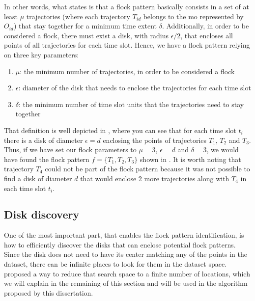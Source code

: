 In other words, what  states is that a flock pattern basically consists in a set of at least $\mu$
trajectories (where each trajectory $T_{id}$ belongs to the \ac{mo} represented by $O_{id}$) that stay together for a
minimum time extent $\delta$. Additionally, in order to be considered a flock, there must exist a disk, with radius
$\epsilon/2$, that encloses all points of all trajectories for each time slot. Hence, we have a flock pattern relying on
three key parameters:

\begin{enumerate}
    \item $\mu$: the minimum number of trajectories, in order to be considered a flock
    \item $\epsilon$: diameter of the disk that needs to enclose the trajectories for each time slot
    \item $\delta$: the minimum number of time slot units that the trajectories need to stay together
\end{enumerate}

That definition is well depicted in , where you can see that for each time slot $t_i$ there is a disk
of diameter $\epsilon = d$ enclosing the points of trajectories $T_1$, $T_2$ and $T_3$. Thus, if we have set our flock
parameters to $\mu = 3$, $\epsilon = d$ and $\delta = 3$, we would have found the flock pattern $f = \{T_1, T_2, T_3\}$
shown in . It is worth noting that trajectory $T_4$ could not be part of the flock pattern because it
was not possible to find a disk of diameter $d$ that would enclose 2 more trajectories along with $T_4$ in each time
slot $t_i$.

\subsection{Disk discovery}
\label{subsec:disk_discovery}

One of the most important part, that enables the flock pattern identification, is how to efficiently discover the disks
that can enclose potential flock patterns. Since the disk does not need to have its center matching any of the points in
the dataset, there can be infinite places to look for them in the dataset space.  proposed a way to
reduce that search space to a finite number of locations, which we will explain in the remaining of this section and
will be used in the algorithm proposed by this dissertation.

